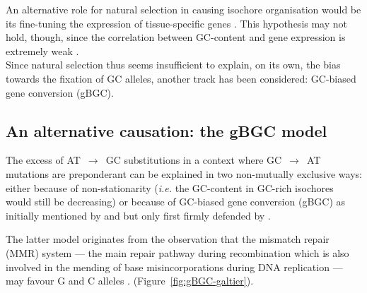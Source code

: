 An alternative role for natural selection in causing isochore organisation would be its fine-tuning the expression of tissue-specific genes \citep{vinogradov2003isochores,vinogradov2005noncoding}.
This hypothesis may not hold, though, since the correlation between GC-content and gene expression is extremely weak \citep[reviewed in \citealp{duret2009biased}]{semon2005relationship,semon2006no}.\\


Since natural selection thus seems insufficient to explain, on its own, the bias towards the fixation of GC alleles, another track has been considered: GC-biased gene conversion (gBGC).





\subsection{An alternative causation: the gBGC model}

The excess of AT~$\rightarrow$~GC substitutions in a context where GC~$\rightarrow$~AT mutations are preponderant can be explained in two non-mutually exclusive ways: either because of non-stationarity (\textit{i.e.} the GC-content in GC-rich isochores would still be decreasing) or because of GC-biased gene conversion (gBGC) as initially mentioned by \citet{holmquist1992chromosome} and \citet{eyre-walker1993recombination,eyre-walker1999evidence} but only first firmly defended by \citet{galtier2001gccontent}.

The latter model originates from the observation that the mismatch repair (MMR) system — the main repair pathway during recombination \citep[reviewed in \citealp{evans2000roles} and \citealp{spies2015mismatch}]{alani1994interaction,nicolas1994polarity} which is also involved in the mending of base misincorporations during DNA replication \citep{surtees2004mismatch} — may favour G and C alleles \citep{brown1988different,bill1998efficient}. (Figure~\ref{fig:gBGC-galtier}). \\


